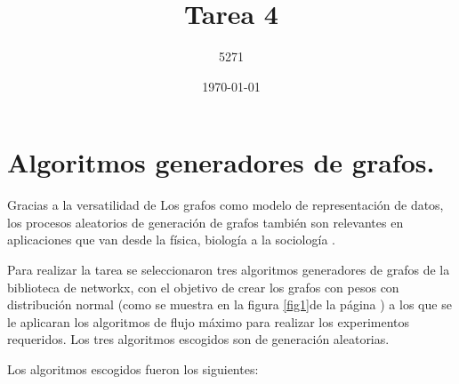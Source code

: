 \documentclass{article}
\title{Tarea 4}
\author{5271}
\date{\today}
\begin{document}
\maketitle

\section{Algoritmos generadores de grafos.}

Gracias a la versatilidad de Los grafos como modelo de representación de datos, los procesos aleatorios de generación de grafos también son relevantes en aplicaciones que van desde la física, biología a la sociología\cite{Nobari} .

Para realizar la tarea se seleccionaron tres algoritmos generadores de grafos de la biblioteca de networkx, con el objetivo de crear los grafos con pesos con distribución normal (como se muestra en la figura \ref{fig1}de la página \pageref{fig1}) a los que se le aplicaran los algoritmos de flujo máximo para realizar los experimentos requeridos. Los tres algoritmos escogidos son de generación aleatorias.
 
Los algoritmos escogidos fueron los siguientes:
\end{document}
